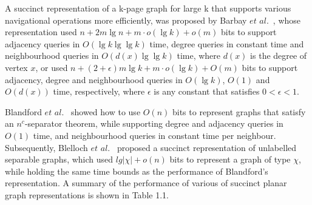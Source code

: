 \documentclass[12pt,glossary]{dalthesis}
\begin{document}
\bigskip
\bigskip

A succinct representation of a k-page graph for large k that supports various navigational operations more efficiently, was proposed by Barbay $et$ $al.$~\cite{Barbay}, whose representation used $n+2m\lg n + m \cdot o(\lg k) + o(m)$ bits to support adjacency queries in $O(\lg k \lg \lg k)$ time, degree queries in constant time and neighbourhood queries in $O(d(x) \lg \lg k)$ time, where $d(x)$ is the degree of vertex $x$, or used $n+(2+\epsilon)m\lg k + m \cdot o(\lg k) + O(m)$ bits to support adjacency, degree and neighbourhood queries in $O(\lg k)$, $O(1)$ and $O(d(x))$ time, respectively, where $\epsilon$ is any constant that satisfies $0< \epsilon <1$.   

\bigskip
\bigskip

Blandford $et$ $al.$~\cite{compact-representation} showed how to use $O(n)$ bits to represent graphs that satisfy an $n^{c}$-separator theorem, while supporting degree and adjacency queries in $O(1)$ time, and neighbourhood queries in constant time per neighbour. Subsequently, Blelloch $et$ $al.$~\cite{succinct-representation} proposed a succinct representation of unlabelled separable graphs, which used $lg| \chi |+ o(n)$ bits to represent a graph of type $\chi$, while holding the same time bounds as the performance of Blandford's representation. A summary of the performance of various of succinct planar graph representations is shown in Table 1.1.
    
\end{document}
